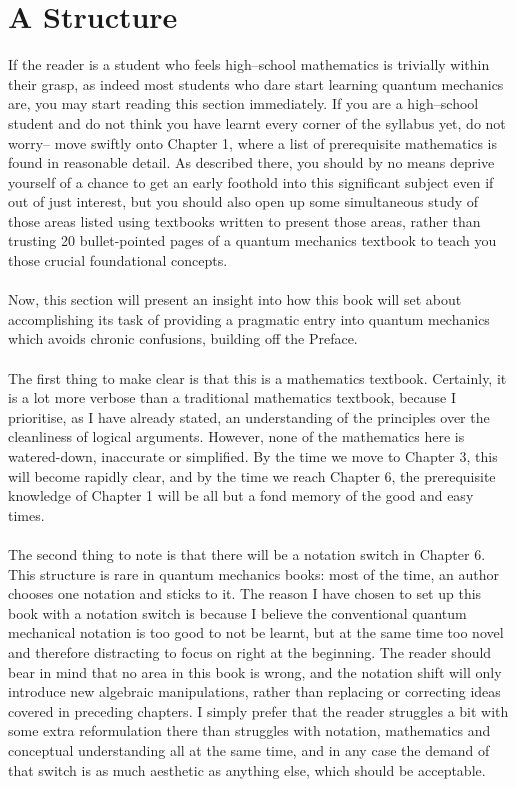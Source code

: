 \section{A Structure}
If the reader is a student who feels high--school mathematics is trivially within their grasp, as indeed most students who dare start learning quantum mechanics are, you may start reading this section immediately. If you are a high--school student and do not think you  have learnt every corner of the syllabus yet, do not worry-- move swiftly onto Chapter 1, where a list of prerequisite mathematics is found in reasonable detail. As described there, you should by no means deprive yourself of a chance to get an early foothold into this significant subject even if out of just interest, but you should also open up some simultaneous study of those areas listed using textbooks written to present those areas, rather than trusting 20 bullet-pointed pages of a quantum mechanics textbook to teach you those crucial foundational concepts.
\\\\
Now, this section will present an insight into how this book will set about accomplishing its task of providing a pragmatic entry into quantum mechanics which avoids chronic confusions, building off the Preface. 
\\\\
The first thing to make clear is that this is a mathematics textbook. Certainly, it is a lot more verbose than a traditional mathematics textbook, because I prioritise, as I have already stated, an understanding of the principles over the cleanliness of logical arguments. However, none of the mathematics here is watered-down, inaccurate or simplified. By the time we move to Chapter 3, this will become rapidly clear, and by the time we reach Chapter 6, the prerequisite knowledge of Chapter 1 will be all but a fond memory of the good and easy times. 
\\\\
The second thing to note is that there will be a notation switch in Chapter 6. This structure is rare in quantum mechanics books: most of the time, an author chooses one notation and sticks to it. The reason I have chosen to set up this book with a notation switch is because I believe the conventional quantum mechanical notation is too good to not be learnt, but at the same time too novel and therefore distracting to focus on right at the beginning. The reader should bear in mind that no area in this book is wrong, and the notation shift will only introduce new algebraic manipulations, rather than replacing or correcting ideas covered in preceding chapters. I simply prefer that the reader struggles a bit with some extra reformulation there than struggles with notation, mathematics and conceptual understanding all at the same time, and in any case the demand of that switch is as much aesthetic as anything else, which should be acceptable.
